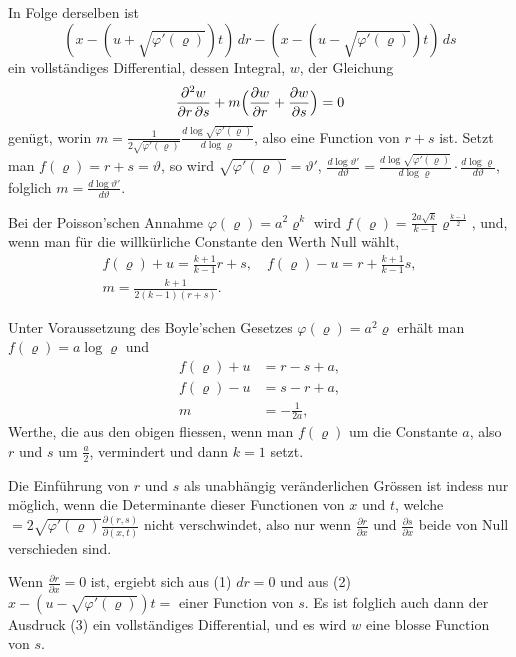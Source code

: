 \documentclass[12pt,a4paper]{book}
\theoremstyle{definition}
\theoremstyle{remark}
\begin{document}
In Folge derselben ist
\begin{equation*}
(x - (u + \sqrt{\varphi'(\varrho)})t)\,dr - (x - (u - \sqrt{\varphi'(\varrho)})t)\,ds\tag{3}
\end{equation*}
ein vollst\"andiges Differential, dessen Integral, $w$, der Gleichung
\[
\frac{\partial^{2}w}{\partial r\,\partial s} + m\Bigl(\frac{\partial w}{\partial r} + \frac{\partial w}{\partial s}\Bigr) = 0
\]
gen\"ugt, worin $m = \frac{1}{2\sqrt{\varphi'(\varrho)}}\frac{d\log\sqrt{\varphi'(\varrho)}}{d\log\varrho}$, also eine Function von $r + s$ ist. Setzt man $f(\varrho) = r + s = \vartheta$, so wird $\sqrt{\varphi'(\varrho)} = \vartheta'$, $\frac{d\log\vartheta'}{d\vartheta} = \frac{d\log\sqrt{\varphi'(\varrho)}}{d\log\varrho} \cdot \frac{d\log\varrho}{d\vartheta}$, folglich $m = \frac{d\log\vartheta'}{d\vartheta}$.

Bei der Poisson'schen Annahme $\varphi(\varrho) = a^{2}\varrho^{k}$ wird $f(\varrho) = \frac{2a\sqrt{k}}{k-1}\varrho^{\frac{k-1}{2}}$, und, wenn man f\"ur die willk\"urliche Constante den Werth Null w\"ahlt,
\begin{align*}
f(\varrho) + u = \frac{k+1}{k-1}r + s,\quad f(\varrho) - u = r + \frac{k+1}{k-1}s,\\
m = \frac{k+1}{2(k-1)(r+s)}.\qquad\qquad\qquad\qquad
\end{align*}

Unter Voraussetzung des Boyle'schen Gesetzes $\varphi(\varrho) = a^{2}\varrho$ erh\"alt man $f(\varrho) = a\log\varrho$ und
\begin{align*}
f(\varrho) + u &= r - s + a,\\
f(\varrho) - u &= s - r + a,\\
m &= -\frac{1}{2a},
\end{align*}
Werthe, die aus den obigen fliessen, wenn man $f(\varrho)$ um die Constante $a$, also $r$ und $s$ um $\frac{a}{2}$, vermindert und dann $k = 1$ setzt.

Die Einf\"uhrung von $r$ und $s$ als unabh\"angig ver\"anderlichen Gr\"ossen ist indess nur m\"oglich, wenn die Determinante dieser Functionen von $x$ und $t$, welche $= 2\sqrt{\varphi'(\varrho)}\frac{\partial(r,s)}{\partial(x,t)}$ nicht verschwindet, also nur wenn $\frac{\partial r}{\partial x}$ und $\frac{\partial s}{\partial x}$ beide von Null verschieden sind.

Wenn $\frac{\partial r}{\partial x} = 0$ ist, ergiebt sich aus (1) $dr = 0$ und aus (2) $x - (u - \sqrt{\varphi'(\varrho)})t =$ einer Function von $s$. Es ist folglich auch dann der Ausdruck (3) ein vollst\"andiges Differential, und es wird $w$ eine blosse Function von $s$.
\end{document}
